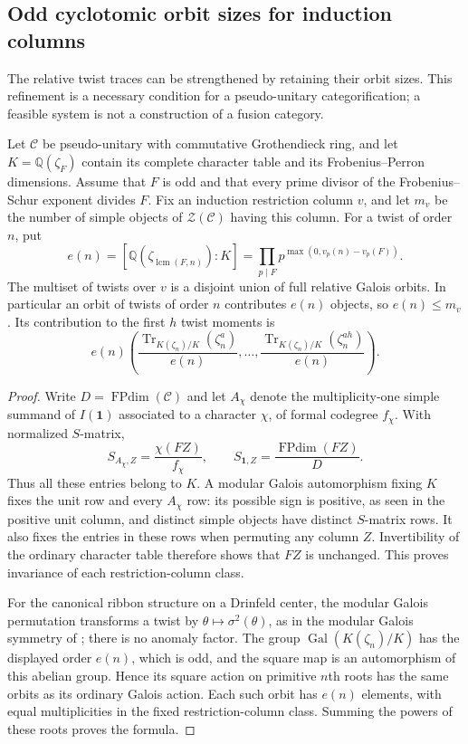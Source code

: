 \subsection{Odd cyclotomic orbit sizes for induction columns}
\label{sec:odd-column-orbits}
The relative twist traces can be strengthened by retaining their orbit sizes.
This refinement is a necessary condition for a pseudo-unitary categorification;
a feasible system is not a construction of a fusion category.

\begin{proposition}\label{prop:odd-column-orbits}
Let $\mathcal C$ be pseudo-unitary with commutative Grothendieck ring, and let
$K=\mathbb Q(\zeta_F)$ contain its complete character table and its Frobenius--Perron dimensions.
Assume that $F$ is odd and that every prime divisor of the Frobenius--Schur
exponent divides $F$.  Fix an induction restriction column $v$, and let $m_v$
be the number of simple objects of $\mathcal Z(\mathcal C)$ having this column.
For a twist of order $n$, put
\[
 e(n)=[\mathbb Q(\zeta_{\operatorname{lcm}(F,n)}):K]
      =\prod_{p\mid F}p^{\max(0,v_p(n)-v_p(F))}.
\]
The multiset of twists over $v$ is a disjoint union of full relative Galois
orbits.  In particular an orbit of twists of order $n$ contributes $e(n)$
objects, so $e(n)\le m_v$.  Its contribution to the first $h$ twist moments is
\[
 e(n)\left(\frac{\operatorname{Tr}_{K(\zeta_n)/K}(\zeta_n^a)}{e(n)},\ldots,
 \frac{\operatorname{Tr}_{K(\zeta_n)/K}(\zeta_n^{ah})}{e(n)}\right).
\]
\end{proposition}

\begin{proof}
Write $D=\operatorname{FPdim}(\mathcal C)$ and let $A_\chi$ denote the
multiplicity-one simple summand of $I(\mathbf1)$ associated to a character
$\chi$, of formal codegree $f_\chi$.  With normalized $S$-matrix,
\[
 S_{A_\chi,Z}=\frac{\chi(FZ)}{f_\chi},\qquad
 S_{\mathbf1,Z}=\frac{\operatorname{FPdim}(FZ)}{D}.
\]
Thus all these entries belong to $K$.  A modular Galois automorphism fixing
$K$ fixes the unit row and every $A_\chi$ row: its possible sign is positive,
as seen in the positive unit column, and distinct simple objects have
 distinct $S$-matrix rows.  It also fixes the entries in these rows when
permuting any column $Z$.  Invertibility of the ordinary character table
therefore shows that $FZ$ is unchanged.  This proves invariance of each
restriction-column class.

For the canonical ribbon structure on a Drinfeld center, the modular Galois
permutation transforms a twist by $\theta\mapsto\sigma^2(\theta)$, as in the modular Galois symmetry of \cite{BNRW}; there is
no anomaly factor.  The group
$\operatorname{Gal}(K(\zeta_n)/K)$ has the displayed order $e(n)$, which is
odd, and the square map is an automorphism of this abelian group.  Hence its
square action on primitive $n$th roots has the same orbits as its ordinary
Galois action.  Each such orbit has $e(n)$ elements, with equal
multiplicities in the fixed restriction-column class.  Summing the powers
of these roots proves the formula.
\end{proof}

